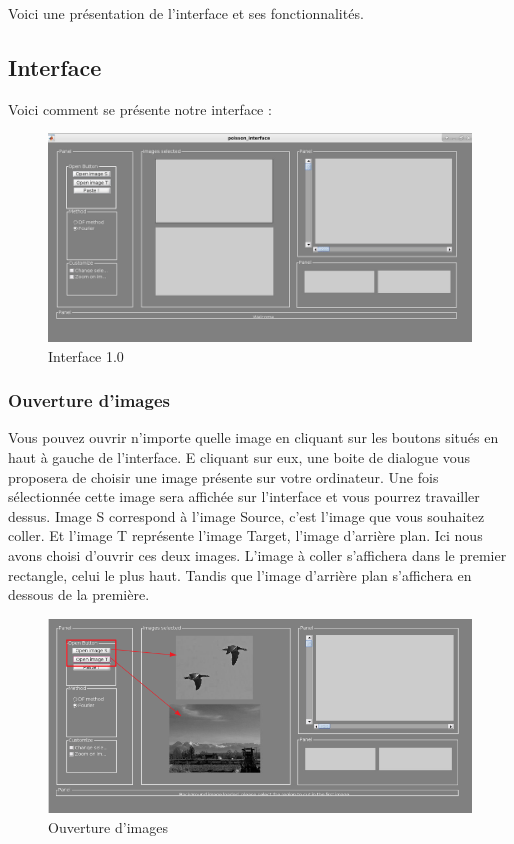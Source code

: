 Voici une présentation de l'interface et ses fonctionnalités.

\subsection{Interface}
Voici comment se présente notre interface : 
\begin{figure}[!h]
    \centering
    \includegraphics[scale = 0.2]{Images/interface.png}
    \caption{Interface 1.0}
\end{figure}{}
\subsubsection{Ouverture d'images}
Vous pouvez ouvrir n'importe quelle image en cliquant sur les boutons situés en haut à gauche de l'interface. E cliquant sur eux, une boite de dialogue vous proposera de choisir une image présente sur votre ordinateur. Une fois sélectionnée cette image sera affichée sur l'interface et vous pourrez travailler dessus. Image S correspond à l'image Source, c'est l'image que vous souhaitez coller. Et l'image T représente l'image Target, l'image d'arrière plan.\newline
Ici nous avons choisi d'ouvrir ces deux images. L'image à coller s'affichera dans le premier rectangle, celui le plus haut. Tandis que l'image d'arrière plan s'affichera en dessous de la première. 
\begin{figure}[!ht]
    \centering
    \includegraphics[scale = 0.3]{Images/images_ouvertes.png}
    \caption{Ouverture d'images}
\end{figure}{}
